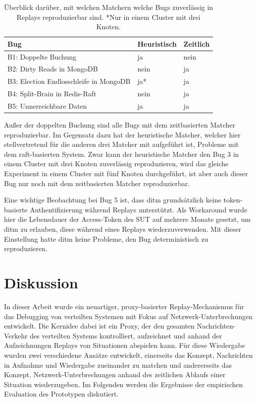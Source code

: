 \documentclass[12pt,a4paper]{report}
\begin{document}
\begin{table}[H]
	\centering
	\caption[Ergebnisse zur Reproduktion von Bugs]{Überblick darüber, mit welchen Matchern welche Bugs zuverlässig in Replays reproduzierbar sind. *Nur in einem Cluster mit
		drei Knoten.}
	\label{tab:debug}
	\begin{tabular}{|l|l|l|}
		\hline
		Bug                                    & Heuristisch & Zeitlich \\ \hline
		B1: Doppelte Buchung                   & ja          & nein     \\ \hline
		B2: Dirty Reads in MongoDB             & nein        & ja       \\ \hline
		B3: Election Endlosschleife in MongoDB & ja*         & ja       \\ \hline
		B4: Split-Brain in Redis-Raft          & nein        & ja       \\ \hline
		B5: Unnerreichbare Daten               & ja          & ja       \\ \hline
	\end{tabular}
\end{table}

Außer der doppelten Buchung sind alle Bugs mit dem zeitbasierten Matcher reproduzierbar. Im Gegensatz dazu hat der heuristische
Matcher, welcher hier stellvertretend für die anderen drei Matcher mit aufgeführt ist, Probleme mit dem raft-basierten System.
Zwar kann der heuristische Matcher den Bug 3 in einem Cluster mit drei Knoten zuverlässig reproduzieren, wird das gleiche
Experiment in einem Cluster mit fünf Knoten durchgeführt, ist aber auch dieser Bug nur noch mit dem zeitbasierten Matcher
reproduzierbar.

Eine wichtige Beobachtung bei Bug 5 ist, dass ditm grundsätzlich keine token-basierte Authentifizierung während Replays
unterstützt. Als Workaround wurde hier die Lebensdauer der Access-Token des SUT auf mehrere Monate gesetzt, um ditm zu erlauben,
diese während eines Replays wiederzuverwenden. Mit dieser Einstellung hatte ditm keine Probleme, den Bug deterministisch zu
reproduzieren.

\chapter{Diskussion}
\label{chap:discussion}
In dieser Arbeit wurde ein neuartiger, proxy-basierter Replay-Mechanismus für das Debugging von verteilten Systemen mit Fokus auf
Netzwerk-Unter\-brech\-ung\-en entwickelt. Die Kernidee dabei ist ein Proxy, der den gesamten Nachrichten-Verkehr des verteilten Systems
kontrolliert, aufzeichnet und anhand der Aufzeichnungen Replays von Situationen abspielen kann. Für diese Wiedergabe wurden zwei
verschiedene Ansätze entwickelt, einerseits das Konzept, Nachrichten in Aufnahme und Wiedergabe zueinander zu matchen und
andererseits das Konzept, Netzwerk-Unterbrechungen anhand des zeitlichen Ablaufs einer Situation wiederzugeben. Im Folgenden
werden die Ergebnisse der empirischen Evaluation des Prototypen diskutiert.
\end{document}
